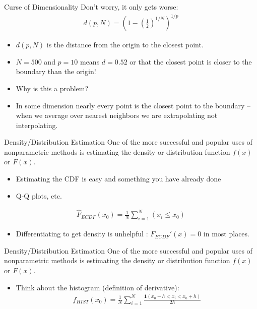 \documentclass[11pt,handout,xcolor=pdftex,dvipsnames,table,mathserif,aspectratio=169]{beamer}
\begin{document}
\begin{frame}{Curse of Dimensionality}
Don't worry, it only gets worse:
\begin{eqnarray*}
d(p,N) = \left(1-\left(\frac{1}{2} \right)^{1/N} \right)^{1/p}
\end{eqnarray*}

\begin{itemize}
\item $d(p,N)$ is the distance from the origin to the closest point.
\item $N=500$ and $p=10$ means $d = 0.52$ or that the closest point is closer to the boundary than the origin!
\item Why is this a problem?
\item In some dimension nearly every point is the closest point to the boundary -- when we average over nearest neighbors we are \alert{extrapolating} not \alert{interpolating}.
\end{itemize}
\end{frame}


\begin{frame}{Density/Distribution Estimation}
One of the more successful and popular uses of nonparametric methods is estimating the density or distribution function $f(x)$ or $F(x)$.
\begin{itemize}
\item Estimating the CDF is easy and something you have already done
\item Q-Q plots, etc.
\end{itemize}
\begin{eqnarray*}
\hat{F}_{ECDF}(x_0) = \frac{1}{N} \sum_{i=1}^N (x_i \leq x_0 )
\end{eqnarray*}
\begin{itemize}
\item Differentiating to get density is unhelpful : $F_{ECDF}'(x) = 0$ in most places.
\end{itemize}
\end{frame}

\begin{frame}{Density/Distribution Estimation}
One of the more successful and popular uses of nonparametric methods is estimating the density or distribution function $f(x)$ or $F(x)$.
\begin{itemize}
\item Think about the histogram (definition of derivative):
\begin{eqnarray*}
\hat{f}_{HIST}(x_0) = \frac{1}{N} \sum_{i=1}^N \frac{\mathbf{1}(x_0 - h < x_i < x_0 + h)}{2 h}
\end{eqnarray*}
\end{itemize}
\end{frame}
\end{document}
